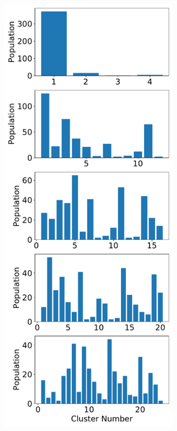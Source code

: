 \documentclass{article}
\begin{document}
  \begin{figure}
  \centering
  \begin{subfigure}{0.24\textwidth}
  \includegraphics[width=\textwidth]{nclusters_ward.pdf}

\end{subfigure}
\end{figure}
\end{document}
